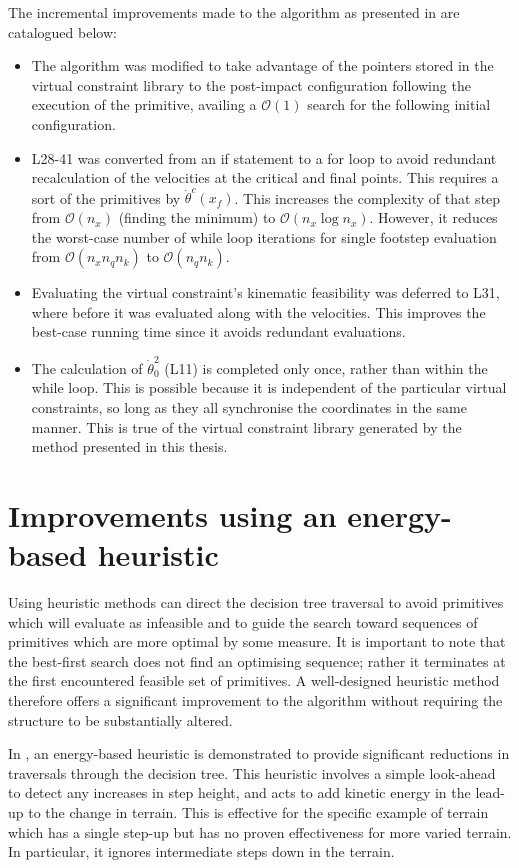 The incremental improvements made to the algorithm as presented in \cite{manchester13planning} are catalogued below:
\begin{itemize}
	\item The algorithm was modified to take advantage of the pointers stored in the virtual constraint library to the post-impact configuration following the execution of the primitive, availing a $\mathcal{O}(1)$ search for the following initial configuration.
	\item L28-41 was converted from an if statement to a for loop to avoid redundant recalculation of the velocities at the critical and final points. This requires a sort of the primitives by $\dot{\theta}^c(x_f)$. This increases the complexity of that step from $\mathcal{O}(n_x)$ (finding the minimum) to $\mathcal{O}(n_x\log n_x)$. However, it reduces the worst-case number of while loop iterations for single footstep evaluation from $\mathcal{O}(n_xn_qn_k)$ to $\mathcal{O}(n_qn_k)$.
	\item Evaluating the virtual constraint's kinematic feasibility was deferred to L31, where before it was evaluated along with the velocities. This improves the best-case running time since it avoids redundant evaluations.
	\item The calculation of $\dot{\theta}_0^2$ (L11) is completed only once, rather than within the while loop. This is possible because it is independent of the particular virtual constraints, so long as they all synchronise the coordinates in the same manner. This is true of the virtual constraint library generated by the method presented in this thesis.
\end{itemize}

\section[Energy-based heuristic]{Improvements using an energy-based heuristic} \label{sec:heuristic}
Using heuristic methods can direct the decision tree traversal to avoid primitives which will evaluate as infeasible and to guide the search toward sequences of primitives which are more optimal by some measure. It is important to note that the best-first search does not find an optimising sequence; rather it terminates at the first encountered feasible set of primitives. A well-designed heuristic method therefore offers a significant improvement to the algorithm without requiring the structure to be substantially altered.

In \cite{manchester13planning}, an energy-based heuristic is demonstrated to provide significant reductions in traversals through the decision tree. This heuristic involves a simple look-ahead to detect any increases in step height, and acts to add kinetic energy in the lead-up to the change in terrain. This is effective for the specific example of terrain which has a single step-up but has no proven effectiveness for more varied terrain. In particular, it ignores intermediate steps down in the terrain.

